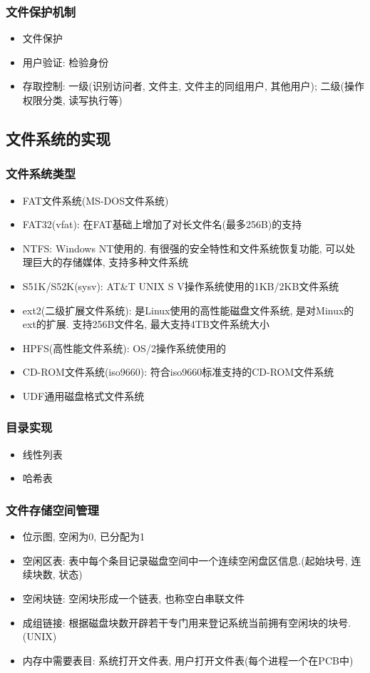 \documentclass[a4paper, UTF8]{article}
\begin{document}
\subsubsection{文件保护机制}
\begin{itemize}
\item 文件保护
\item 用户验证: 检验身份
\item 存取控制: 一级(识别访问者, 文件主, 文件主的同组用户, 其他用户); 二级(操作权限分类, 读写执行等)
\end{itemize}
\subsection{文件系统的实现}
\subsubsection{文件系统类型}
\begin{itemize}
\item FAT文件系统(MS-DOS文件系统)
\item FAT32(vfat): 在FAT基础上增加了对长文件名(最多256B)的支持
\item NTFS: Windows NT使用的. 有很强的安全特性和文件系统恢复功能, 可以处理巨大的存储媒体, 支持多种文件系统
\item S51K/S52K(sysv): AT\&T UNIX S V操作系统使用的1KB/2KB文件系统
\item ext2(二级扩展文件系统): 是Linux使用的高性能磁盘文件系统, 是对Minux的ext的扩展. 支持256B文件名, 最大支持4TB文件系统大小
\item HPFS(高性能文件系统): OS/2操作系统使用的
\item CD-ROM文件系统(iso9660): 符合iso9660标准支持的CD-ROM文件系统
\item UDF通用磁盘格式文件系统
\end{itemize}
\subsubsection{目录实现}
\begin{itemize}
\item 线性列表
\item 哈希表
\end{itemize}
\subsubsection{文件存储空间管理}
\begin{itemize}
\item 位示图, 空闲为0, 已分配为1
\item 空闲区表: 表中每个条目记录磁盘空间中一个连续空闲盘区信息.(起始块号, 连续块数, 状态)
\item 空闲块链: 空闲块形成一个链表, 也称空白串联文件
\item 成组链接: 根据磁盘块数开辟若干专门用来登记系统当前拥有空闲块的块号. (UNIX)
\item 内存中需要表目: 系统打开文件表, 用户打开文件表(每个进程一个在PCB中)
\end{itemize}
\end{document}
